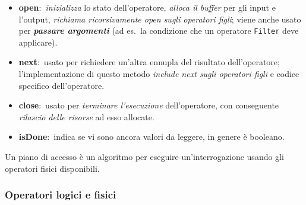 \begin{itemize}
	\item \textbf{open}:\ \textit{inizializza} lo stato dell'operatore, \textit{alloca il buffer} per gli input e l'output, \textit{richiama ricorsivamente open sugli operatori figli}; viene anche usato per \textbf{\textit{passare argomenti}} (ad es.\ la condizione che un operatore \texttt{Filter} deve applicare).
	\item \textbf{next}:\ usato per richiedere un'altra ennupla del risultato dell'operatore; l'implementazione di questo metodo \textit{include next sugli operatori figli} e codice specifico dell'operatore.
	\item \textbf{close}:\ usato per \textit{terminare l'esecuzione} dell'operatore, con conseguente \textit{rilascio delle risorse} ad esso allocate.\
	\item \textbf{isDone}:\ indica se vi sono ancora valori da leggere, in genere è booleano.\
\end{itemize}

\noindent Un piano di accesso è un algoritmo per eseguire un'interrogazione usando gli operatori fisici disponibili.

\subsubsection{Operatori logici e fisici}

